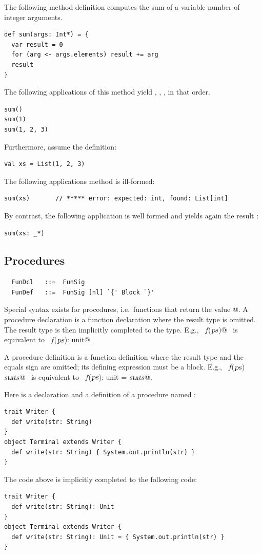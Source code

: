 \example The following method definition computes the sum of a variable number
of integer arguments.
\begin{lstlisting}
def sum(args: Int*) = {
  var result = 0
  for (arg <- args.elements) result += arg
  result
}
\end{lstlisting}
The following applications of this method yield , ,
, in that order.
\begin{lstlisting}
sum()
sum(1)
sum(1, 2, 3)
\end{lstlisting}
Furthermore, assume the definition:
\begin{lstlisting}
val xs = List(1, 2, 3)
\end{lstlisting}
The following applications method \lstinline@sum@ is ill-formed:
\begin{lstlisting}
sum(xs)       // ***** error: expected: int, found: List[int]
\end{lstlisting}
By contrast, the following application is well formed and yields again
the result :
\begin{lstlisting}
sum(xs: _*) 
\end{lstlisting}

\subsection{Procedures}\label{sec:procedures}

\syntax\begin{lstlisting} 
  FunDcl   ::=  FunSig
  FunDef   ::=  FunSig [nl] `{' Block `}'
\end{lstlisting}

Special syntax exists for procedures, i.e.\ functions that return the
\verb@unit@ value \verb@{}@. 
A procedure declaration is a function declaration where the result type
is omitted. The result type is then implicitly completed to the
\verb@unit@ type. E.g., ~\lstinline@def $f$($\mbox{\sl ps}$)@~ is equivalent to
~\lstinline@def $f$($\mbox{\sl ps}$): unit@.

A procedure definition is a function definition where the result type
and the equals sign are omitted; its defining expression must be a block.
E.g., ~\lstinline@def $f$($\mbox{\sl ps}$) {$\mbox{\sl stats}$}@~ is equivalent to
~\lstinline@def $f$($\mbox{\sl ps}$): unit = {$\mbox{\sl stats}$}@.

\example Here is a declaration and a definition of a procedure named \lstinline@write@: 
\begin{lstlisting}
trait Writer { 
  def write(str: String)
}
object Terminal extends Writer {
  def write(str: String) { System.out.println(str) }
}
\end{lstlisting}
The code above is implicitly completed to the following code:
\begin{lstlisting}
trait Writer { 
  def write(str: String): Unit
}
object Terminal extends Writer {
  def write(str: String): Unit = { System.out.println(str) }
}
\end{lstlisting}

